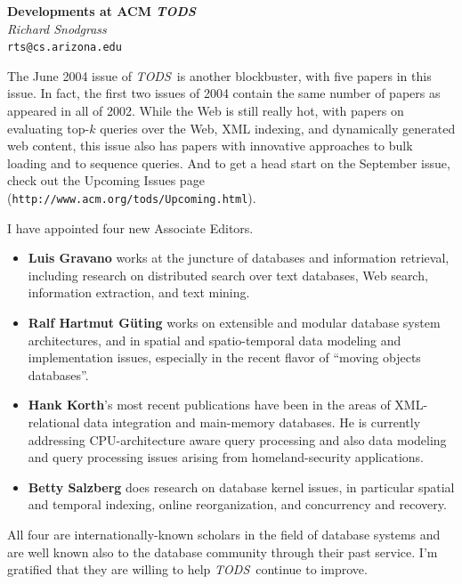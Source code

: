 \documentclass[11pt]{article}
\newcommand{\tods}{{\em TODS\/}}
\begin{document}
\begin{center}
{\Large\bf Developments at ACM {\em TODS}}\\[2ex]
{\large\it  Richard Snodgrass}\\[1ex]
{\tt rts@cs.arizona.edu}\\[3ex]
\end{center}

The June 2004 issue of \tods\ is another blockbuster, with five papers
in this issue. In fact, the first two issues of 2004 contain the same number
of papers as appeared in all of 2002. While the Web is still really
hot, with papers on evaluating top-$k$ queries over the Web, XML indexing,
and dynamically generated web content, this issue also has papers with
innovative approaches to bulk loading and to sequence queries. And to get a head
start on the September issue, check out the Upcoming Issues page ({\tt http://www.acm.org/tods/Upcoming.html}).

\vspace{2em}
I have appointed four new Associate Editors.

\begin{itemize}
\item {\bf Luis Gravano} works at the juncture of databases and information
  retrieval, including research on distributed search over text
  databases, Web search, information extraction, and text mining.

\item {\bf Ralf Hartmut G\"{u}ting} works on extensible and modular database
system architectures, and in spatial and spatio-temporal data modeling and 
implementation issues, especially in the recent flavor of ``moving 
objects databases''.

\item {\bf Hank Korth}'s most recent publications have been in the areas of
XML-relational data integration and main-memory databases.  He is currently
addressing CPU-architecture aware query processing and also data modeling
and query processing issues arising from homeland-security applications.

\item {\bf Betty Salzberg} does research on database kernel issues, in
  particular spatial and temporal indexing, online reorganization, and
  concurrency and recovery.

\end{itemize}

\noindent
All four are internationally-known scholars in the field of
database systems and are well known also to the database community
through their past service. I'm gratified that they are willing
to help \tods\ continue to improve.
\end{document}
